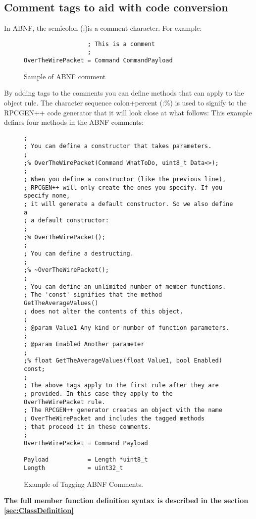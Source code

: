 \subsection{Comment tags to aid with code conversion}
In ABNF, the semicolon (;)is a comment character.
For example:
\begin{figure}
\begin{verbatim}
                  ; This is a comment
                  ;
OverTheWirePacket = Command CommandPayload

\end{verbatim}
\caption{Sample of ABNF comment}
\label{fig:SampleABNFComment}
\end{figure}

By adding tags to the comments you can define
methods that can apply to the object rule.
The character sequence colon+percent (:\%) is used to signify
to the RPCGEN++ code generator that it will look close
at what follows:
This example defines four methods in the ABNF comments:
\begin{figure}
\begin{verbatim}
;
; You can define a constructor that takes parameters.
;
;% OverTheWirePacket(Command WhatToDo, uint8_t Data<>);
;
; When you define a constructor (like the previous line),
; RPCGEN++ will only create the ones you specify. If you specify none,
; it will generate a default constructor. So we also define a
; a default constructor:
;
;% OverTheWirePacket();
;
; You can define a destructing.
;
;% ~OverTheWirePacket();
;
; You can define an unlimited number of member functions.
; The 'const' signifies that the method GetTheAverageValues()
; does not alter the contents of this object.
;
; @param Value1 Any kind or number of function parameters.
;
; @param Enabled Another parameter
;
;% float GetTheAverageValues(float Value1, bool Enabled) const;
;
; The above tags apply to the first rule after they are
; provided. In this case they apply to the OverTheWirePacket rule.
; The RPCGEN++ generator creates an object with the name
; OverTheWirePacket and includes the tagged methods
; that proceed it in these comments.
;
OverTheWirePacket = Command Payload

Payload           = Length *uint8_t
Length            = uint32_t

\end{verbatim}
\caption{Example of Tagging ABNF Comments.}
\label{fig:ClassIntro}
\end{figure}

\textbf{The full member function definition syntax is described
in the section \ref{sec:ClassDefinition}}

